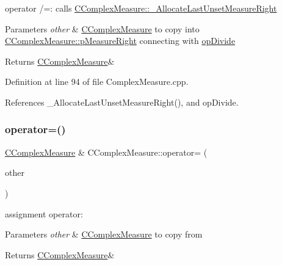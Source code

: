 operator /=\+: calls \hyperlink{classCComplexMeasure_aee812c93b8b2fe3839e9a38df63cfd53}{C\+Complex\+Measure\+::\+\_\+\+Allocate\+Last\+Unset\+Measure\+Right} 


\begin{DoxyParams}{Parameters}
{\em other} & \hyperlink{classCComplexMeasure}{C\+Complex\+Measure} to copy into \hyperlink{classCComplexMeasure_abbafc4b16676d223ed34860b8ece1b6b}{C\+Complex\+Measure\+::p\+Measure\+Right} connecting with \hyperlink{MeasureOperator_8h_a1431c79e3ad4b4c5bcc9f31f188538f2a160251a34f9a9a8ee362dc477d5ba790}{op\+Divide} \\
\hline
\end{DoxyParams}
\begin{DoxyReturn}{Returns}
\hyperlink{classCComplexMeasure}{C\+Complex\+Measure}\& 
\end{DoxyReturn}


Definition at line 94 of file Complex\+Measure.\+cpp.



References \+\_\+\+Allocate\+Last\+Unset\+Measure\+Right(), and op\+Divide.

\mbox{\label{classCComplexMeasure_a37668c1f7c157050080c0065ecbb596d}} 
\subsubsection{\texorpdfstring{operator=()}{operator=()}}
{\footnotesize\ttfamily \hyperlink{classCComplexMeasure}{C\+Complex\+Measure} \& C\+Complex\+Measure\+::operator= (\begin{DoxyParamCaption}\item[{const \hyperlink{classCComplexMeasure}{C\+Complex\+Measure} \&}]{other }\end{DoxyParamCaption})}



assignment operator\+: 


\begin{DoxyParams}{Parameters}
{\em other} & \hyperlink{classCComplexMeasure}{C\+Complex\+Measure} to copy from \\
\hline
\end{DoxyParams}
\begin{DoxyReturn}{Returns}
\hyperlink{classCComplexMeasure}{C\+Complex\+Measure}\& 
\end{DoxyReturn}


